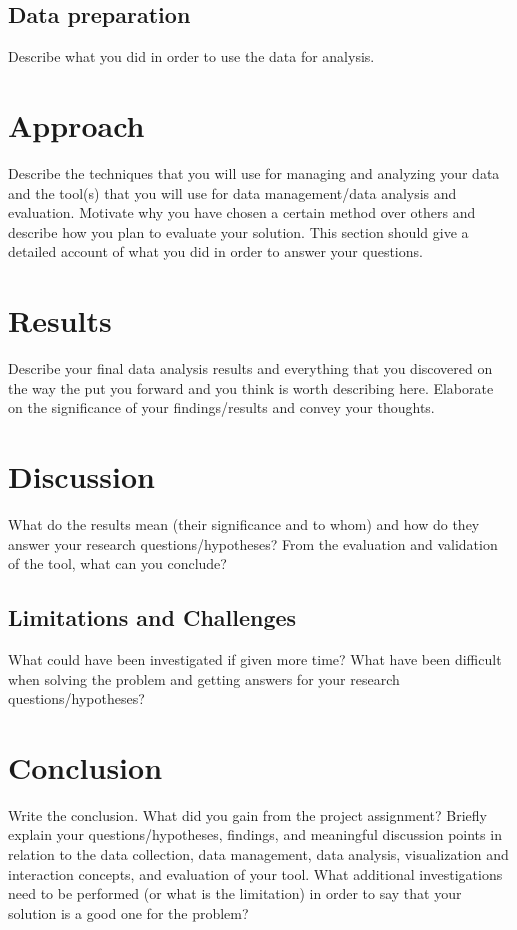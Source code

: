 \subsection{Data preparation}
\label{sec:data}
Describe what you did in order to use the data for analysis.

\section{Approach}
\label{chap:approach}
Describe the techniques that you will use for managing and analyzing your data and the tool(s) that you will use for data management/data analysis and evaluation. Motivate why you have chosen a certain method over others and describe how you plan to evaluate your solution. This section should give a detailed account of what you did in order to answer your questions.

\section{Results}
\label{chap:results}
Describe your final data analysis results and everything that you discovered on the way the put you forward and you think is worth describing here. Elaborate on the significance of your findings/results and convey your thoughts. 

\section{Discussion}
\label{chap:discussion}
What do the results mean (their significance and to whom) and how do they answer your research questions/hypotheses? From the evaluation and validation of the tool, what can you conclude? 

\subsection{Limitations and Challenges}
\label{sec:limitation}
What could have been investigated if given more time? What have been difficult when solving the problem and getting answers for your research questions/hypotheses?

\section{Conclusion}
\label{chap:conclusion}
Write the conclusion. What did you gain from the project assignment? Briefly explain your questions/hypotheses, findings, and meaningful discussion points in relation to the data collection, data management, data analysis, visualization and interaction concepts, and evaluation of your tool.
What additional investigations need to be performed (or what is the limitation) in order to say that your solution is a good one for the problem? 

